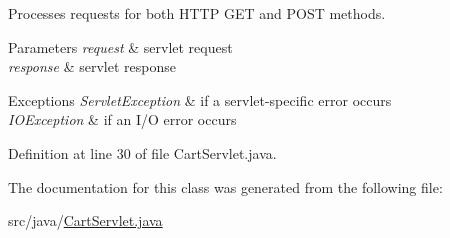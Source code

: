 Processes requests for both H\+T\+TP {\ttfamily G\+ET} and {\ttfamily P\+O\+ST} methods.


\begin{DoxyParams}{Parameters}
{\em request} & servlet request \\
\hline
{\em response} & servlet response \\
\hline
\end{DoxyParams}

\begin{DoxyExceptions}{Exceptions}
{\em Servlet\+Exception} & if a servlet-\/specific error occurs \\
\hline
{\em I\+O\+Exception} & if an I/O error occurs \\
\hline
\end{DoxyExceptions}


Definition at line 30 of file Cart\+Servlet.\+java.



The documentation for this class was generated from the following file\+:\begin{DoxyCompactItemize}
\item 
src/java/\mbox{\hyperlink{_cart_servlet_8java}{Cart\+Servlet.\+java}}\end{DoxyCompactItemize}
